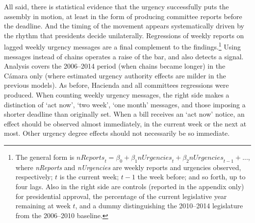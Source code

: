 \documentclass[letter,12pt]{article}
\begin{document}
All said, there is statistical evidence that the urgency successfully puts the assembly in motion, at least in the form of producing committee reports before the deadline. And the timing of the movement appears systematically driven by the rhythm that presidents decide unilaterally. Regressions of weekly reports on lagged weekly urgency messages are a final complement to the findings.\footnote{The general form is $\mathit{nReports}_t = \beta_0 + \beta_1 \mathit{nUrgencies}_t + \beta_2 \mathit{nUrgencies}_{t-1} + ...$, where \emph{nReports} and \emph{nUrgencies} are weekly reports and urgencies observed, respectively; $t$ is the current week; $t-1$ the week before; and so forth, up to four lags. Also in the right side are controls (reported in the appendix only) for presidential approval, the percentage of the current legislative year remaining at week $t$, and a dummy distinguishing the 2010--2014 legislature from the 2006--2010 baseline.} Using messages instead of chains operates a raise of the bar, and also detects a signal. Analysis covers the 2006--2014 period (when chains became longer) in the C\'amara only (where estimated urgency authority effects are milder in the previous models). As before, Hacienda and all committees regressions were produced. When counting weekly urgency messages, the right side makes a distinction of `act now', `two week', `one month' messages, and those imposing a shorter deadline than originally set. When a bill receives an `act now' notice, an effect should be observed almost immediately, in the current week or the next at most. Other urgency degree effects should not necessarily be so immediate. 
\end{document}
